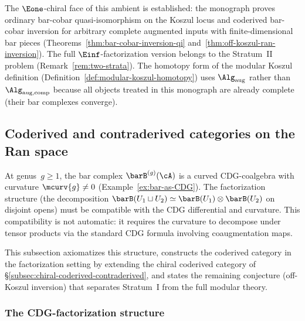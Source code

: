 \begin{remark}[Status]\label{rem:completed-ambient-status}
The $\Eone$-chiral face of this ambient is established: the
monograph proves ordinary bar-cobar quasi-isomorphism on the
Koszul locus and coderived bar-cobar inversion for arbitrary
complete augmented inputs with finite-dimensional bar pieces
\textup{(}Theorems~\ref{thm:bar-cobar-inversion-qi}
and~\ref{thm:off-koszul-ran-inversion}\textup{)}. The full
$\Einf$-factorization version belongs to the Stratum~II problem
(Remark~\ref{rem:two-strata}). The homotopy form of the modular
Koszul definition
(Definition~\ref{def:modular-koszul-homotopy}) uses
$\Alg_{\mathrm{aug}}$ rather than
$\Alg_{\mathrm{aug,comp}}$ because all objects treated in this
monograph are already complete (their bar complexes converge).
\end{remark}


\subsection{Coderived and contraderived categories on the Ran space}
\label{subsec:coderived-ran-formalism}

At genus~$g \geq 1$, the bar complex $\barB^{(g)}(\cA)$ is a
curved CDG-coalgebra with curvature $\mcurv{g} \neq 0$
(Example~\ref{ex:bar-as-CDG}). The factorization structure (the
decomposition
$\barB(U_1 \sqcup U_2) \simeq \barB(U_1) \otimes \barB(U_2)$
on disjoint opens) must be compatible with the CDG differential
and curvature. This compatibility is not automatic: it requires
the curvature to decompose under tensor products via the standard
CDG formula involving coaugmentation maps.

This subsection axiomatizes this structure, constructs the coderived
category in the factorization setting by extending the chiral
coderived category of
\S\ref{subsec:chiral-coderived-contraderived}, and states
the remaining conjecture (off-Koszul inversion) that separates
Stratum~I from the full modular theory.

\subsubsection*{The CDG-factorization structure}
\label{subsec:CDG-factorization}

